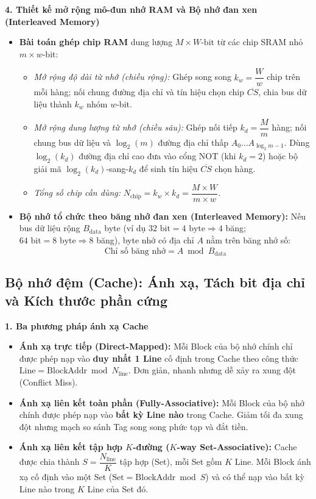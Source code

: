 \textbf{4. Thiết kế mở rộng mô-đun nhớ RAM và Bộ nhớ đan xen (Interleaved Memory)}
\begin{itemize}
    \item \textbf{Bài toán ghép chip RAM} dung lượng $M \times W\text{-bit}$ từ các chip SRAM nhỏ $m \times w\text{-bit}$:
    \begin{itemize}
        \item \textit{Mở rộng độ dài từ nhớ (chiều rộng):} Ghép song song $k_w = \dfrac{W}{w}$ chip trên mỗi hàng; nối chung đường địa chỉ và tín hiệu chọn chip $\overline{CS}$, chia bus dữ liệu thành $k_w$ nhóm $w$-bit.
        \item \textit{Mở rộng dung lượng từ nhớ (chiều sâu):} Ghép nối tiếp $k_d = \dfrac{M}{m}$ hàng; nối chung bus dữ liệu và $\log_2(m)$ đường địa chỉ thấp $A_0\dots A_{\log_2 m - 1}$. Dùng $\log_2(k_d)$ đường địa chỉ cao đưa vào cổng NOT (khi $k_d = 2$) hoặc bộ giải mã $\log_2(k_d)$-sang-$k_d$ để sinh tín hiệu $\overline{CS}$ chọn hàng.
        \item \textit{Tổng số chip cần dùng:} $N_{\text{chip}} = k_w \times k_d = \dfrac{M \times W}{m \times w}$.
    \end{itemize}
    \item \textbf{Bộ nhớ tổ chức theo băng nhớ đan xen (Interleaved Memory):} Nếu bus dữ liệu rộng $B_{\text{data}}$ byte (ví dụ $32\text{ bit} = 4\text{ byte} \Rightarrow 4$ băng; $64\text{ bit} = 8\text{ byte} \Rightarrow 8$ băng), byte nhớ có địa chỉ $A$ nằm trên băng nhớ số:
    $$\text{Chỉ số băng nhớ} = A \bmod B_{\text{data}}$$
\end{itemize}

\subsection{Bộ nhớ đệm (Cache): Ánh xạ, Tách bit địa chỉ và Kích thước phần cứng}

\textbf{1. Ba phương pháp ánh xạ Cache}
\begin{itemize}
    \item \textbf{Ánh xạ trực tiếp (Direct-Mapped):} Mỗi Block của bộ nhớ chính chỉ được phép nạp vào \textbf{duy nhất 1 Line} cố định trong Cache theo công thức $\text{Line} = \text{BlockAddr} \bmod N_{\text{line}}$. Đơn giản, nhanh nhưng dễ xảy ra xung đột (Conflict Miss).
    \item \textbf{Ánh xạ liên kết toàn phần (Fully-Associative):} Mỗi Block của bộ nhớ chính được phép nạp vào \textbf{bất kỳ Line nào} trong Cache. Giảm tối đa xung đột nhưng mạch so sánh Tag song song phức tạp và đắt tiền.
    \item \textbf{Ánh xạ liên kết tập hợp $K$-đường ($K$-way Set-Associative):} Cache được chia thành $S = \dfrac{N_{\text{line}}}{K}$ tập hợp (Set), mỗi Set gồm $K$ Line. Mỗi Block ánh xạ cố định vào một Set ($\text{Set} = \text{BlockAddr} \bmod S$) và có thể nạp vào bất kỳ Line nào trong $K$ Line của Set đó.
\end{itemize}

